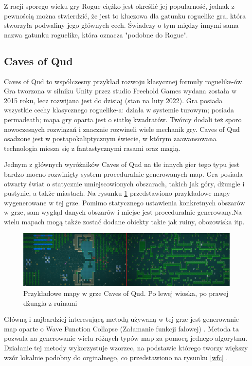 \documentclass[12pt,twoside]{article}
\begin{document}
Z racji sporego wieku gry Rogue ciężko jest określić jej popularność, jednak z pewnością można stwierdzić, że jest to kluczowa dla gatunku roguelike gra, która stworzyła podwaliny jego głównych cech. Świadczy o tym między innymi sama nazwa gatunku roguelike, która oznacza "podobne do Rogue".



\subsection{Caves of Qud}
Caves of Qud to współczesny przykład rozwoju klasycznej formuły roguelike-ów. Gra tworzona w silniku Unity przez studio Freehold Games wydana została w 2015 roku, lecz rozwijana jest do dzisiaj (stan na luty 2022). Gra posiada wszystkie cechy klasycznego roguelike-a: działa w systemie turowym; posiada permadeath; mapa gry oparta jest o siatkę kwadratów. Twórcy dodali też sporo nowoczesnych rozwiązań i znacznie rozwineli wiele mechanik gry. Caves of Qud osadzone jest w postapokaliptycznym świecie, w którym zaawansowana technologia miesza się z fantastycznymi rasami oraz magią.


Jednym z głównych wyróżników Caves of Qud na tle innych gier tego typu jest bardzo mocno rozwinięty system proceduralnie generowanych map. Gra posiada otwarty świat o statycznie umiejscowionych obszarach, takich jak góry, dżungle i pustynie, a także miastach. Na rysunku \ref{CoQ:scr1} przedstawiono przykładowe mapy wygenerowane w tej grze. Pomimo statycznego ustawienia konkretnych obszarów w grze, sam wygląd danych obszarów i miejsc jest proceduralnie generowany.Na wielu mapach mogą także zostać dodane obiekty takie jak ruiny, obozowiska itp.

\FloatBarrier
\begin{figure}[h]
	\centering
	\includegraphics[width=16cm]{images/caves_of_qud/scr1.png}
	\caption{Przykładowe mapy w grze Caves of Qud. Po lewej wioska, po prawej dżungla z ruinami}
	\label{CoQ:scr1}
\end{figure}
\FloatBarrier

Główną i najbardziej interesującą metodą używaną w tej grze jest generowanie map oparte o Wave Function Collapse (Załamanie funkcji falowej) \cite{coq_wfc}. Metoda ta pozwala na generowanie wielu różnych typów map za pomocą jednego algorytmu. Działanie tej metody wykorzystuje wzorzec, na podstawie którego tworzy większy wzór lokalnie podobny do orginalnego, co przedstawiono na rysunku \ref{wfc} \cite{wfc_git}.
\end{document}
